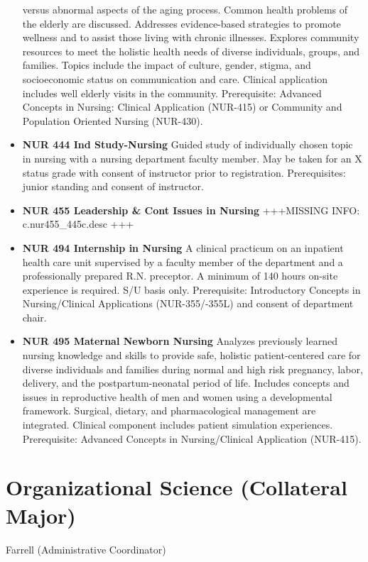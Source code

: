 \documentclass[
  letterpaper,
]{scrbook}
\begin{document}
\begin{itemize}
  versus abnormal aspects of the aging process. Common health problems
  of the elderly are discussed. Addresses evidence-based strategies to
  promote wellness and to assist those living with chronic illnesses.
  Explores community resources to meet the holistic health needs of
  diverse individuals, groups, and families. Topics include the impact
  of culture, gender, stigma, and socioeconomic status on communication
  and care. Clinical application includes well elderly visits in the
  community. Prerequisite: Advanced Concepts in Nursing: Clinical
  Application (NUR-415) or Community and Population Oriented Nursing
  (NUR-430).
\item
  \textbf{NUR 444 Ind Study-Nursing} Guided study of individually chosen
  topic in nursing with a nursing department faculty member. May be
  taken for an X status grade with consent of instructor prior to
  registration. Prerequisites: junior standing and consent of
  instructor.
\item
  \textbf{NUR 455 Leadership \& Cont Issues in Nursing} +++MISSING INFO:
  c.nur455\_445c.desc +++
\item
  \textbf{NUR 494 Internship in Nursing} A clinical practicum on an
  inpatient health care unit supervised by a faculty member of the
  department and a professionally prepared R.N. preceptor. A minimum of
  140 hours on-site experience is required. S/U basis only.
  Prerequisite: Introductory Concepts in Nursing/Clinical Applications
  (NUR-355/-355L) and consent of department chair.
\item
  \textbf{NUR 495 Maternal Newborn Nursing} Analyzes previously learned
  nursing knowledge and skills to provide safe, holistic
  patient-centered care for diverse individuals and families during
  normal and high risk pregnancy, labor, delivery, and the
  postpartum-neonatal period of life. Includes concepts and issues in
  reproductive health of men and women using a developmental framework.
  Surgical, dietary, and pharmacological management are integrated.
  Clinical component includes patient simulation experiences.
  Prerequisite: Advanced Concepts in Nursing/Clinical Application
  (NUR-415).
\end{itemize}

\section{Organizational Science (Collateral
Major)}\label{sec-organizational-science}

Farrell (Administrative Coordinator)
\end{document}
